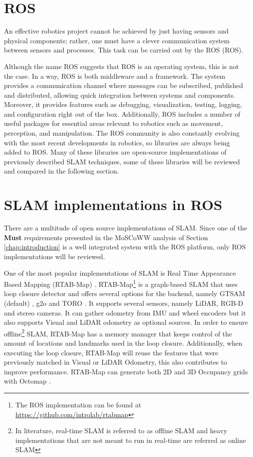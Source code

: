 \section{\acs{ROS}}

An effective robotics project cannot be achieved by just having sensors and physical components; rather, one must have a clever communication system between sensors and processes. This task can be carried out by the \acl*{ROS} (\acs*{ROS}). 

Although the name \acl*{ROS} suggests that \acs*{ROS} is an operating system, this is not the case.  In a way, \acs*{ROS} is both middleware and a framework. The system provides a communication channel where messages can be subscribed, published and distributed, allowing quick integration between systems and components. Moreover, it provides features such as debugging, visualization, testing, logging, and configuration right out of the box. Additionally, ROS includes a number of useful packages for essential areas relevant to robotics such as movement, perception, and manipulation. The ROS community is also constantly evolving with the most recent developments in robotics, so libraries are always being added to ROS. Many of these libraries are open-source implementations of previously described \acs*{SLAM} techniques, some of these libraries will be reviewed and compared in the following section.


\section{\acs*{SLAM} implementations in \acs*{ROS}}

There are a multitude of open source implementations of \acs*{SLAM}. Since one of the \textbf{Must} requirements presented in the MoSCoWW analysis of Section \ref*{chap:introduction} is a well integrated system with the \acs*{ROS} platform, only \acs*{ROS} implementations will be reviewed. 

One of the most popular implementations of \acs*{SLAM} is Real Time Appearance Based Mapping (RTAB-Map) \cite{labbe_rtab-map_2019}. RTAB-Map\footnote{The \acs*{ROS} implementation can be found at \url{https://github.com/introlab/rtabmap}} is a graph-based \acs*{SLAM} that uses loop closure detector and offers several options for the backend, namely GTSAM (default) \cite{gtsam}, g2o \cite{kummerle_g2o_2011} and TORO \cite{grisetti_nonlinear_2009}. It supports several sensors, namely \acs*{LiDAR}, RGB-D and stereo cameras. It can gather odometry from \acs*{IMU} and wheel encoders but it also supports Visual and \acs*{LiDAR} odometry as optional sources. In order to ensure offline\footnote{In literature, real-time \acs*{SLAM} is referred to as offline \acs*{SLAM} and heavy implementations that are not meant to run in real-time are referred as online \acs*{SLAM}} \acs*{SLAM}, RTAB-Map has a memory manager that keeps control of the amount of locations and landmarks used in the loop closure. Additionally, when executing the loop closure, RTAB-Map will reuse the features that were previously matched in Visual or \acs*{LiDAR} Odometry, this also contributes to improve performance. RTAB-Map can generate both 2D and 3D Occupancy grids with Octomap \cite{hornung_octomap_2013}.

